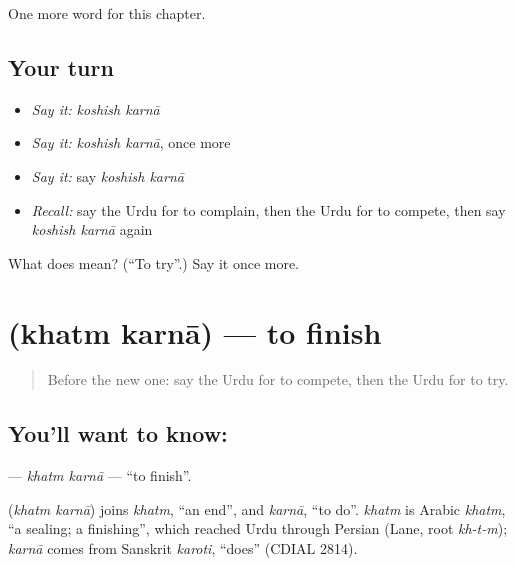 \begin{grammarlens}[title={What you've built}]
One more word for this chapter.
\end{grammarlens}

\subsection*{Your turn}
\begin{itemize}
\raggedright
  \item \emph{Say it:} \emph{koshish karnā}
  \item \emph{Say it:} \emph{koshish karnā}, once more
  \item \emph{Say it:} say \emph{koshish karnā}
  \item \emph{Recall:} say the Urdu for to complain, then the Urdu for to compete, then say \emph{koshish karnā} again
\end{itemize}

\begin{tcolorbox}[breakable,colback=teal!4,colframe=teal!35!black,title={Before you move on}]
What does   mean? (\textquotedblleft{}To try\textquotedblright{}.) Say it once more.
\end{tcolorbox}
\section[\texorpdfstring{\ur{ختم} \ur{کرنا} (khatm karnā)}{ختم کرنا (khatm karnā)}]{  (khatm karnā) — to finish}

\label{lesson:UR-C242-khatm-karna}



\begin{quote}
Before the new one: say the Urdu for to compete, then the Urdu for to try.
\end{quote}

\subsection*{You'll want to know:  }
\textbf{ } — \emph{khatm karnā} — \textquotedblleft{}to finish\textquotedblright{}.

\begin{cousinweb}
\textbf{ } (\emph{khatm karnā}) joins \emph{khatm}, \textquotedblleft{}an end\textquotedblright{}, and \emph{karnā}, \textquotedblleft{}to do\textquotedblright{}. \emph{khatm} is Arabic \emph{khatm}, \textquotedblleft{}a sealing; a finishing\textquotedblright{}, which reached Urdu through Persian (Lane, root \emph{kh-t-m}); \emph{karnā} comes from Sanskrit \emph{karoti}, \textquotedblleft{}does\textquotedblright{} (CDIAL 2814).
\end{cousinweb}

